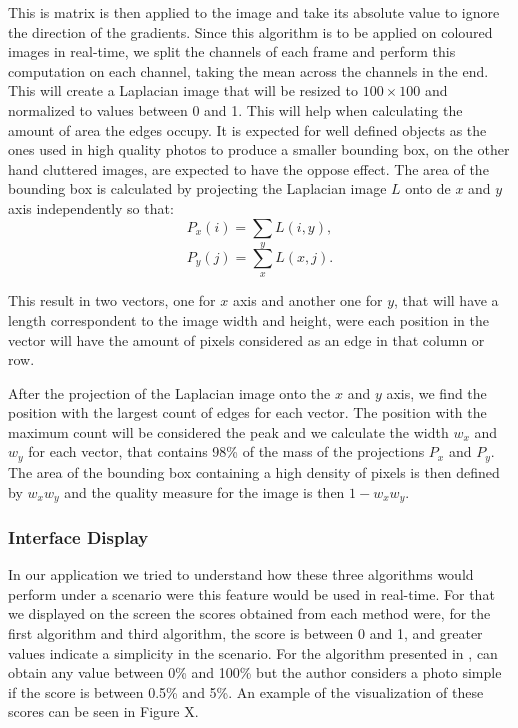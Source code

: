 This is matrix is then applied to the image and take its absolute value to ignore the direction of the gradients. Since this algorithm is to be applied on coloured images in real-time, we split the channels of each frame and perform this computation on each channel, taking the mean across the channels in the end. This will create a Laplacian image that will be resized to $100\times100$ and normalized to values between 0 and 1. This will help when calculating the amount of area the edges occupy. It is expected for well defined objects as the ones used in high quality photos to produce a smaller bounding box, on the other hand cluttered images, are expected to have the oppose effect.
The area of the bounding box is calculated by projecting the Laplacian image $L$ onto de $x$ and $y$ axis independently so that:
\begin{equation}
P_{x}(i) = \sum_{y} L(i,y),
\end{equation}
\begin{equation}
P_{y}(j) = \sum_{x} L(x,j).
\end{equation}

This result in two vectors, one for $x$ axis and another one for $y$, that will have a length correspondent to the image width and height, were each position in the vector will have the amount of pixels considered as an edge in that column or row.

After the projection of the Laplacian image onto the $x$ and $y$ axis, we find the position with the largest count of edges for each vector. The position with the maximum count will be considered the peak and we calculate the width $w_{x}$ and $w_{y}$ for each vector, that contains 98\% of the mass of the projections $P_{x}$ and $P_{y}$. The area of the bounding box containing a high density of pixels is then defined by $w_{x}w_{y}$ and the quality measure for the image is then $1-w_{x}w_{y}$.

\subsubsection{Interface Display}

In our application we tried to understand how these three algorithms would perform under a scenario were this feature would be used in real-time. For that we displayed on the screen the scores obtained from each method were, for the first algorithm\cite{kaoautomatic} and third algorithm\cite{ke2006design}, the score is between 0 and 1, and greater values indicate a simplicity in the scenario. 
For the algorithm presented in \cite{luo2008photo}, can obtain any value between 0\% and 100\% but the author considers a photo simple if the score is between 0.5\% and 5\%. An example of the visualization of these scores can be seen in Figure X.

